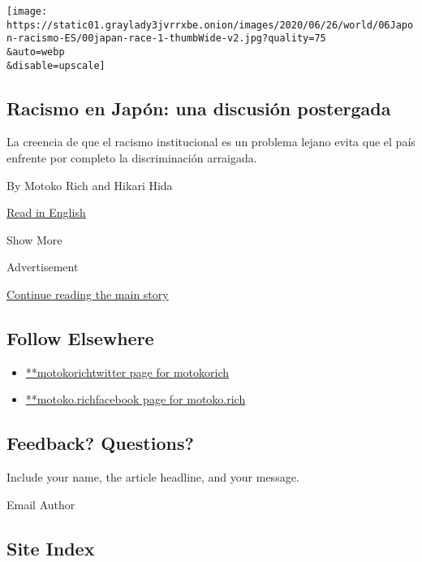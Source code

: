 \begin{enumerate}
  \texttt{[image: https://static01.graylady3jvrrxbe.onion/images/2020/06/26/world/06Japon-racismo-ES/00japan-race-1-thumbWide-v2.jpg?quality=75\\\&auto=webp\\\&disable=upscale]}

  \hypertarget{racismo-en-japuxf3n-una-discusiuxf3n-postergada}{%
  \subsection{Racismo en Japón: una discusión
  postergada}\label{racismo-en-japuxf3n-una-discusiuxf3n-postergada}}

  La creencia de que el racismo institucional es un problema lejano
  evita que el país enfrente por completo la discriminación arraigada.

  By Motoko Rich and Hikari Hida

  \href{https://www.nytimes3xbfgragh.onion/2020/07/01/world/asia/japan-racism-black-lives-matter.html}{Read
  in English}
\end{enumerate}

Show More

Advertisement

\protect\hyperlink{after-mid2}{Continue reading the main story}

\hypertarget{follow-elsewhere}{%
\subsection{Follow Elsewhere}\label{follow-elsewhere}}

\begin{itemize}
\tightlist
\item
  \href{https://twitter.com/motokorich}{**motokorichtwitter page for
  motokorich}
\item
  \href{https://www.facebookcorewwwi.onion/motoko.rich}{**motoko.richfacebook
  page for motoko.rich}
\end{itemize}

\hypertarget{feedback-questions}{%
\subsection{Feedback? Questions?}\label{feedback-questions}}

Include your name, the article headline, and your message.

Email Author

\hypertarget{site-index}{%
\subsection{Site Index}\label{site-index}}

